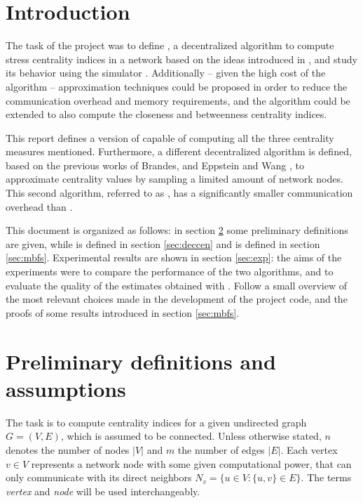 
\theoremstyle{definition}
\newtheorem*{defcc}{Closeness centrality}
\newtheorem*{defsc}{Stress centrality}
\newtheorem*{defbc}{Betweenness centrality}

\section{Introduction}

The task of the project was to define \deccen{}, a decentralized algorithm to compute stress centrality indices in a network based on the ideas introduced in \cite{lehmann2003}, and study its behavior using the \peersim{} simulator \cite{peersim}. Additionally -- given the high cost of the algorithm -- approximation techniques could be proposed in order to reduce the communication overhead and memory requirements, and the algorithm could be extended to also compute the closeness and betweenness centrality indices.

This report defines a version of \deccen{} capable of computing all the three centrality measures mentioned. Furthermore, a different decentralized algorithm is defined, based on the previous works of Brandes, and Eppstein and Wang \cite{brandes2001, ew2004, brandes2007}, to approximate centrality values by sampling a limited amount of network nodes. This second algorithm, referred to as \multibfs{}, has a significantly smaller communication overhead than \deccen{}.

This document is organized as follows: in section \ref{sec:def} some preliminary definitions are given, while \deccen{} is defined in section \ref{sec:deccen} and \multibfs{} is defined in section \ref{sec:mbfs}. Experimental results are shown in section \ref{sec:exp}: the aims of the experiments were to compare the performance of the two algorithms, and to evaluate the quality of the estimates obtained with \multibfs{}. Follow a small overview of the most relevant choices made in the development of the project code, and the proofs of some results introduced in section \ref{sec:mbfs}.


\section{Preliminary definitions and assumptions}
\label{sec:def}

The task is to compute centrality indices for a given undirected graph $G = (V,E)$, which is assumed to be connected. Unless otherwise stated, $n$ denotes the number of nodes $|V|$ and $m$ the number of edges $|E|$. Each vertex $v \in V$ represents a network node with some given computational power, that can only communicate with its direct neighbors $N_v = \{u \in V : \{u,v\} \in E\}$. The terms \emph{vertex} and \emph{node} will be used interchangeably.

